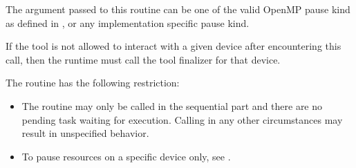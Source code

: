 The argument  passed to this routine can be one of the valid OpenMP pause kind 
as defined in , or any implementation specific pause kind.

\tools

If the tool is not allowed to interact with a given device after encountering this call, then the runtime must call
the tool finalizer for that device.

\restrictions
The   routine has the following restriction:

\begin{itemize}
\item The routine may only be called in the sequential part and there are no pending task waiting for execution. Calling in any other circumstances may result in unspecified behavior.
\end{itemize}

\crossreferences

\begin{itemize}
\item To pause resources on a specific device only, see
.
\end{itemize}



